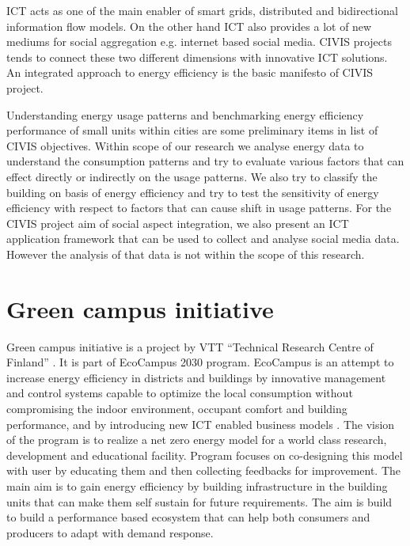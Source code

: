 ICT acts as one of the main enabler of smart grids,  distributed  and bidirectional information flow models. On the other hand ICT also provides a lot of new mediums for social aggregation e.g. internet based social media. CIVIS projects tends to connect these two different dimensions with innovative ICT solutions. An integrated approach to energy efficiency is the basic manifesto of CIVIS project. \cite{civisproposal}

Understanding energy usage patterns and benchmarking energy efficiency performance of small units within cities are some preliminary items in list of CIVIS objectives. Within scope of our research we analyse energy data to understand the consumption patterns and try to evaluate various factors that can effect directly or indirectly on the usage patterns. We also try to classify the building on basis of energy efficiency and try to test the sensitivity of energy efficiency with respect to factors that can cause shift in usage patterns. For the CIVIS project aim of social aspect integration, we also present an ICT application framework that can be used to collect and analyse social media data. However the analysis of that data is not within the scope of this research. 


\section{Green campus initiative}

Green campus initiative is a project by VTT  ``Technical Research Centre of Finland'' . It is part of EcoCampus 2030 program. EcoCampus is an attempt to increase energy efficiency in districts and buildings by innovative management and control systems capable to optimize the local consumption without compromising the indoor environment, occupant comfort and building performance, and by introducing new ICT enabled business models \cite{ greencampus}. The vision of the program is to realize a net zero energy model for a world class research, development and educational facility. Program focuses on co-designing this model with user by educating them and then collecting feedbacks for improvement. The main aim is to gain energy efficiency by building infrastructure in the building units that can make them self sustain for future requirements. The aim is build to build a performance based ecosystem that can help both consumers and producers to adapt with demand response.

